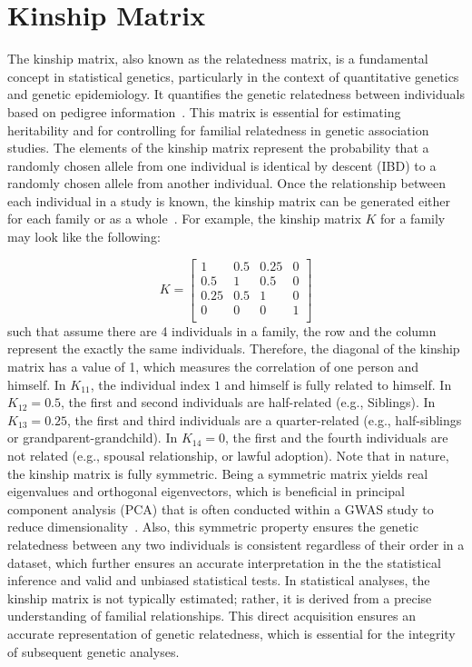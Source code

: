 \section{Kinship Matrix}
The kinship matrix, also known as the relatedness matrix, is a fundamental concept in statistical genetics, particularly in the context of quantitative genetics and genetic epidemiology. 
It quantifies the genetic relatedness between individuals based on pedigree information~\cite{lynch1998genetics}. 
This matrix is essential for estimating heritability and for controlling for familial relatedness in genetic association studies. 
The elements of the kinship matrix represent the probability that a randomly chosen allele from one individual is identical by descent (IBD) to a randomly chosen allele from another individual.
Once the relationship between each individual in a study is known, the kinship matrix can be generated either for each family or as a whole~\cite{sinnwell2014kinship2}. 
For example, the kinship matrix $K$ for a family may look like the following:

\begin{equation*}
    K = \begin{bmatrix}
    1    & 0.5  & 0.25 & 0 \\
    0.5  & 1    & 0.5  & 0 \\
    0.25 & 0.5 & 1    & 0 \\
    0    & 0    & 0    & 1 \\
    \end{bmatrix}
\end{equation*}
such that assume there are 4 individuals in a family, the row and the column represent the exactly the same individuals. 
Therefore, the diagonal of the kinship matrix has a value of 1, which measures the correlation of one person and himself. 
In $K_{11}$, the individual index $1$ and himself is fully related to himself. 
In $K_{12}=0.5$, the first and second individuals are half-related (e.g., Siblings). 
In $K_{13}=0.25$, the first and third individuals are a quarter-related (e.g., half-siblings or grandparent-grandchild). 
In $K_{14}=0$, the first and the fourth individuals are not related (e.g., spousal relationship, or lawful adoption). 
Note that in nature, the kinship matrix is fully symmetric. 
Being a symmetric matrix yields real eigenvalues and orthogonal eigenvectors, which is beneficial in principal component analysis (PCA) that is often conducted within a GWAS study to reduce dimensionality~\cite{price2006principal}. 
Also, this symmetric property ensures the genetic relatedness between any two individuals is consistent regardless of their order in a dataset, which further ensures an accurate interpretation in the the statistical inference and valid and unbiased statistical tests. 
In statistical analyses, the kinship matrix is not typically estimated; rather, it is derived from a precise understanding of familial relationships. 
This direct acquisition ensures an accurate representation of genetic relatedness, which is essential for the integrity of subsequent genetic analyses.


